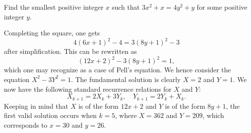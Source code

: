\begin{question}[30]\label{Q::2022-O-1-21}
    Find the smallest positive integer $x$ such that $3x^2 + x = 4y^2 + y$ for some positive integer $y$.
\end{question}
\begin{solution*}
    Completing the square, one gets \[4(6x+1)^2 - 4 = 3(8y+1)^2 - 3\] after simplification. This can be rewritten as \[(12x+2)^2 - 3(8y+1)^2 = 1,\] which one may recognize as a case of Pell's equation. We hence consider the equation $X^2 - 3Y^2 = 1$. The fundamental solution is clearly $X = 2$ and $Y = 1$. We now have the following standard recurrence relations for $X$ and $Y$: \[X_{k+1} = 2X_k + 3Y_k, \quad Y_{k+1} = 2Y_k + X_k.\] Keeping in mind that $X$ is of the form $12x + 2$ and $Y$ is of the form $8y +1$, the first valid solution occurs when $k = 5$, where $X = 362$ and $Y = 209$, which corresponds to $x = 30$ and $y = 26$.
\end{solution*}

